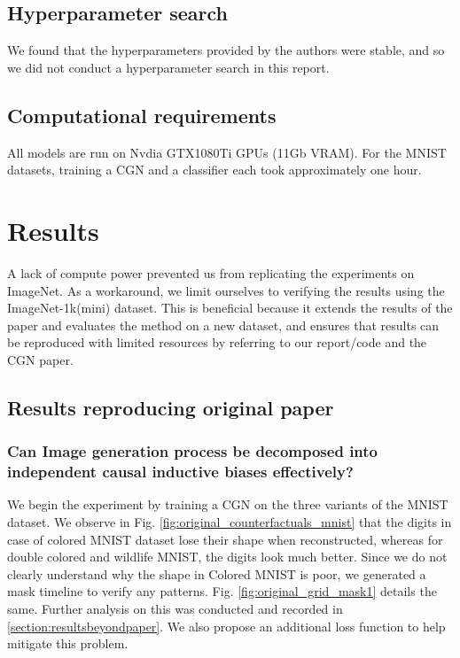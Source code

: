 \subsection{Hyperparameter search}
We found that the hyperparameters provided by the authors were stable, and so we did not conduct a hyperparameter search in this report.

\subsection{Computational requirements}
All models are run on Nvdia GTX1080Ti GPUs (11Gb VRAM). For the MNIST datasets, training a CGN and a classifier each took approximately one hour.

\section{Results}
\label{sec:results}
A lack of compute power prevented us from replicating the experiments on ImageNet. As a workaround,  we limit ourselves to verifying the results using the ImageNet-1k(mini) dataset. This is beneficial because it extends the results of the paper and evaluates the method on a new dataset, and ensures that results can be reproduced with limited resources by referring to our report/code and the CGN paper.

\subsection{Results reproducing original paper}


\subsubsection{Can Image generation process be decomposed into independent causal inductive biases effectively?}

We begin the experiment by training a CGN on the three variants of the MNIST dataset. We observe in Fig. \ref{fig:original_counterfactuals_mnist} that the digits in case of colored MNIST dataset lose their shape when reconstructed, whereas for double colored and wildlife MNIST, the digits look much better. Since we do not clearly understand why the shape in Colored MNIST is poor, we generated a mask timeline to verify any patterns. Fig. \ref{fig:original_grid_mask1} details the same. Further analysis on this was conducted and recorded in \ref{section:resultsbeyondpaper}. We also propose an additional loss function to help mitigate this problem.

